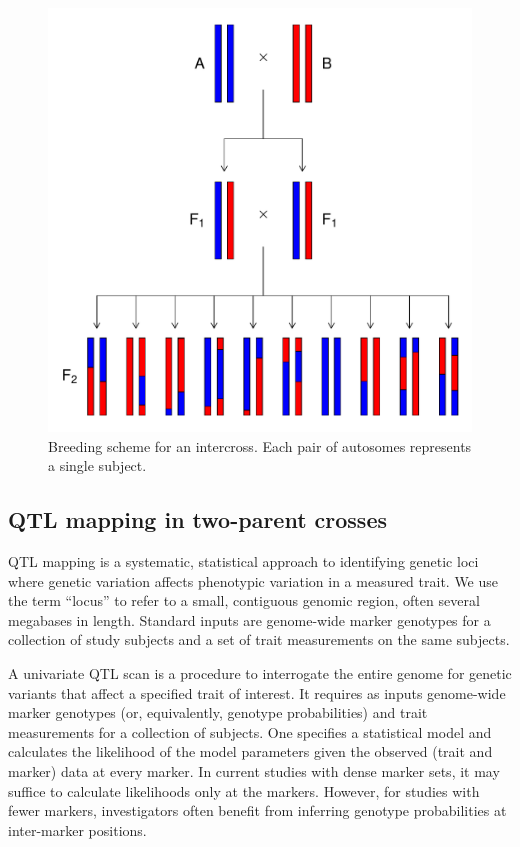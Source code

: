 \documentclass[oneside]{book}\usepackage[]{graphicx}\usepackage[]{color}
\makeatletter
\def\maxwidth{ %
  \ifdim\Gin@nat@width>\linewidth
    \linewidth
  \else
    \Gin@nat@width
  \fi
}
\newenvironment{knitrout}{}{} %
\makeatother
\begin{document}
\begin{knitrout}
\color{fgcolor}\begin{figure}
\includegraphics[width=\maxwidth]{figure/intercross-1} \caption[Breeding scheme for an intercross]{Breeding scheme for an intercross. Each pair of autosomes represents a single subject.}\label{fig:intercross}
\end{figure}


\end{knitrout}


\subsection{QTL mapping in two-parent crosses}

QTL mapping is a systematic, statistical approach to identifying genetic
loci where genetic variation affects phenotypic variation in a measured trait.
We use the term ``locus'' to refer to a small, contiguous genomic region, often
several megabases in length. Standard inputs are genome-wide marker genotypes for a collection of study subjects and a set of trait measurements on the same subjects.

A univariate QTL scan is a procedure to interrogate the entire genome for genetic
variants that affect a specified trait of interest.
It requires as inputs genome-wide marker genotypes (or, equivalently,
genotype probabilities) and trait measurements for a collection of subjects.
One specifies a statistical model and calculates the
likelihood of the model parameters given the observed (trait and marker) data at every marker. In current studies with dense marker sets, 
it may suffice to calculate likelihoods only at the markers. However, for
studies with fewer markers, investigators often benefit from inferring 
genotype probabilities at inter-marker positions.
\end{document}
